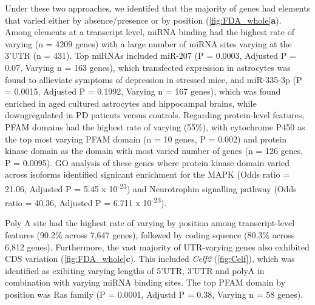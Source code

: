 Under these two approaches, we identifed that the majority of genes had elements that varied either by absence/presence or by position (\cref{fig:FDA_whole}\textbf{a}). Among elements at a transcript level, miRNA binding had the highest rate of varying (n = 4209 genes) with a large number of miRNA sites varying at the 3'UTR (n = 431). Top miRNAs included miR-207 (P = 0.0003, Adjusted P = 0.07, Varying n = 163 genes), which transfected expression in astrocytes was found to allieviate symptoms of depression in stressed mice\cite{Li2020}, and miR-335-3p (P = 0.0015, Adjusted P = 0.1992, Varying n = 167 genes), which was found enriched in aged cultured astrocytes and hippocampal brains\cite{Raihan2018}, while downgregulated in PD patients versus controls\cite{Oliveira2020}. 
Regarding protein-level features, PFAM domains had the highest rate of varying (55\%), with cytochrome P450 as the top most varying PFAM domain (n = 10 genes, P = 0.002) and protein kinase domain as the domain with most varied number of genes (n = 126 genes, P = 0.0095). GO analysis of these genes where protein kinase domain varied across isoforms identified signicant enrichment for the MAPK (Odds ratio = 21.06, Adjusted P = 5.45 x 10\textsuperscript{-23}) and Neurotrophin signalling pathway (Odds ratio = 40.36, Adjusted P = 6.711 x 10\textsuperscript{-23}). 

Poly A site had the highest rate of varying by position among transcript-level features (90.2\% across 7,647 genes), followed by coding squence (80.3\% across 6,812 genes). Furthermore, the vast majority of UTR-varying genes also exhibited CDS variation (\cref{fig:FDA_whole}\textbf{c}). This included \textit{Celf2} (\cref{fig:Celf}), which was identified as exibiting varying lengths of 5'UTR, 3'UTR and polyA in combination with varying miRNA binding sites. The top PFAM domain by position was Ras family (P = 0.0001, Adjustd P = 0.38, Varying n = 58 genes). 

